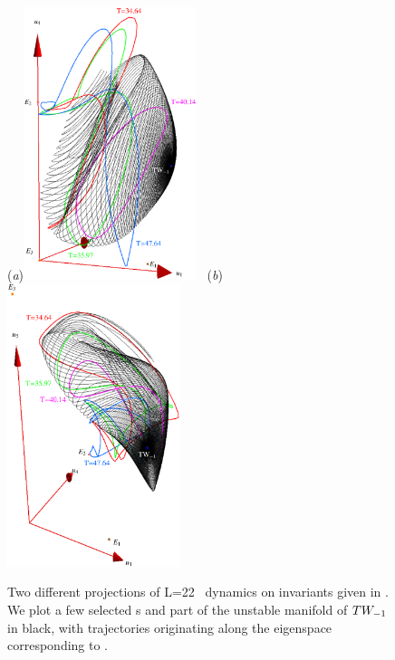 \begin{figure}[t]
\begin{center}
  (\textit{a})\includegraphics[width=0.45\textwidth, clip=true]{../figs/ks22tw1umInv2}
~(\textit{b})\includegraphics[width=0.45\textwidth, clip= true]{../figs/ks22tw1umInv}
\end{center}
\caption[\KS\  reduced \statesp\ projection, $\REQV{-}{1}$ unstable manifold]
{Two different projections of L=22 \KS\ dynamics on invariants
given in . We plot a few selected {\rpo s} and part of 
the unstable manifold of 
$\REQV{-}{1}$ in black, with trajectories originating along the eigenspace 
corresponding to \eigExp[1].}
\label{fig:TW1red}
\end{figure}

